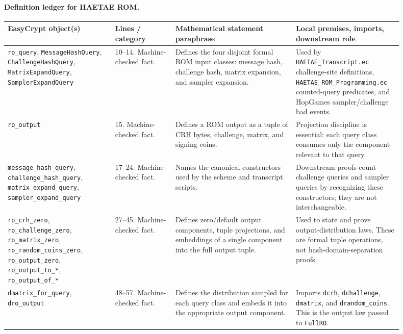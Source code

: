 \documentclass[11pt]{report}
\DeclareRobustCommand{\file}[1]{\ifmmode\text{\nolinkurl{#1}}\else\nolinkurl{#1}\fi}
\DeclareRobustCommand{\ec}[1]{\ifmmode\text{\nolinkurl{#1}}\else\nolinkurl{#1}\fi}
\theoremstyle{definition}
\theoremstyle{plain}
\begin{document}
\paragraph{Definition ledger for HAETAE ROM.}
{\footnotesize
\begin{longtable}{p{0.25\linewidth}p{0.14\linewidth}p{0.28\linewidth}p{0.23\linewidth}}
\toprule
\textbf{EasyCrypt object(s)} & \textbf{Lines / category} &
\textbf{Mathematical statement paraphrase} &
\textbf{Local premises, imports, downstream role} \\
\midrule
\ec{ro\_query}, \ec{MessageHashQuery}, \ec{ChallengeHashQuery},
\ec{MatrixExpandQuery}, \ec{SamplerExpandQuery} &
10--14. Machine-checked fact. &
Defines the four disjoint formal ROM input classes: message hash, challenge
hash, matrix expansion, and sampler expansion. &
Used by \file{HAETAE\_Transcript.ec} challenge-site definitions,
\file{HAETAE\_ROM\_Programming.ec} counted-query predicates, and HopGames
sampler/challenge bad events. \\
\midrule
\ec{ro\_output} &
15. Machine-checked fact. &
Defines a ROM output as a tuple of CRH bytes, challenge, matrix, and signing
coins. &
Projection discipline is essential: each query class consumes only the
component relevant to that query. \\
\midrule
\ec{message\_hash\_query}, \ec{challenge\_hash\_query},
\ec{matrix\_expand\_query}, \ec{sampler\_expand\_query} &
17--24. Machine-checked fact. &
Names the canonical constructors used by the scheme and transcript scripts. &
Downstream proofs count challenge queries and sampler queries by recognizing
these constructors; they are not interchangeable. \\
\midrule
\ec{ro\_crh\_zero}, \ec{ro\_challenge\_zero}, \ec{ro\_matrix\_zero},
\ec{ro\_random\_coins\_zero}, \ec{ro\_output\_zero},
\ec{ro\_output\_to\_*}, \ec{ro\_output\_of\_*} &
27--45. Machine-checked fact. &
Defines zero/default output components, tuple projections, and embeddings of a
single component into the full output tuple. &
Used to state and prove output-distribution laws.  These are formal tuple
operations, not hash-domain-separation proofs. \\
\midrule
\ec{dmatrix\_for\_query}, \ec{dro\_output} &
48--57. Machine-checked fact. &
Defines the distribution sampled for each query class and embeds it into the
appropriate output component. &
Imports \ec{dcrh}, \ec{dchallenge}, \ec{dmatrix}, and
\ec{drandom\_coins}.  This is the output law passed to \ec{FullRO}. \\

\end{longtable}}
\end{document}
